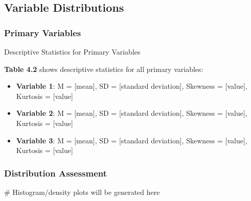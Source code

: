 \documentclass[
  12pt,
  letterpaper,
  12pt,
  letterpaper,
  oneside]{report}
\newenvironment{Shaded}{\begin{snugshade}}{\end{snugshade}}
\newcommand{\CommentTok}[1]{\textcolor[rgb]{0.37,0.37,0.37}{#1}}
\providecommand{\tightlist}{%
  \setlength{\itemsep}{0pt}\setlength{\parskip}{0pt}}
\begin{document}
\subsection{Variable Distributions}\label{variable-distributions}

\subsubsection{Primary Variables}\label{primary-variables}

\begin{table}

\caption{\label{tbl-descriptives}Descriptive Statistics for Primary
Variables}

\centering{

\begin{Shaded}
\begin{Highlighting}[]
\CommentTok{\# Descriptive statistics table will be generated here}
\end{Highlighting}
\end{Shaded}

}

\end{table}%

\textbf{Table 4.2} shows descriptive statistics for all primary
variables:

\begin{itemize}
\tightlist
\item
  \textbf{Variable 1}: M = {[}mean{]}, SD = {[}standard deviation{]},
  Skewness = {[}value{]}, Kurtosis = {[}value{]}
\item
  \textbf{Variable 2}: M = {[}mean{]}, SD = {[}standard deviation{]},
  Skewness = {[}value{]}, Kurtosis = {[}value{]}
\item
  \textbf{Variable 3}: M = {[}mean{]}, SD = {[}standard deviation{]},
  Skewness = {[}value{]}, Kurtosis = {[}value{]}
\end{itemize}

\subsubsection{Distribution Assessment}\label{distribution-assessment}

\begin{Shaded}
\begin{Highlighting}[]
\CommentTok{\# Histogram/density plots will be generated here}
\end{Highlighting}
\end{Shaded}
\end{document}
